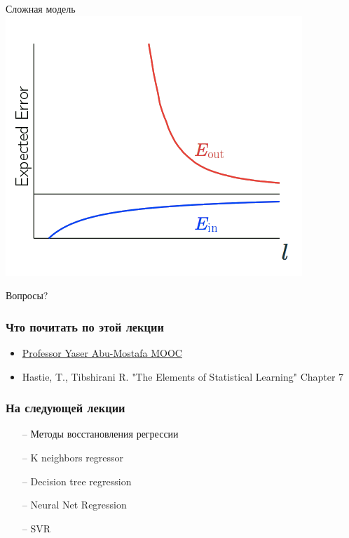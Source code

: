 \documentclass[10pt]{beamer}
\begin{document}
\begin{frame}{Сложная модель}
  \centering
  \includegraphics[width=0.8 \textwidth, keepaspectratio]{images/complex_model}
\end{frame}

\begin{frame}[standout]
  Вопросы?
\end{frame}

\appendix

\begin{frame}\frametitle{Что почитать по этой лекции}
  \begin{itemize}
    \item \href{http://work.caltech.edu/telecourse.html}{Professor Yaser Abu-Mostafa MOOC}
    \item  Hastie, T., Tibshirani R. "The Elements of Statistical Learning" Chapter 7 
  \end{itemize}
\end{frame}

\begin{frame}\frametitle{На следующей лекции}
	\begin{itemize}
    	\item[--] Методы восстановления регрессии
    	\item[--] K neighbors regressor 	    	
    	\item[--] Decision tree regression 
    	\item[--] Neural Net Regression
    	\item[--] SVR
	\end{itemize}
\end{frame}
\end{document}
